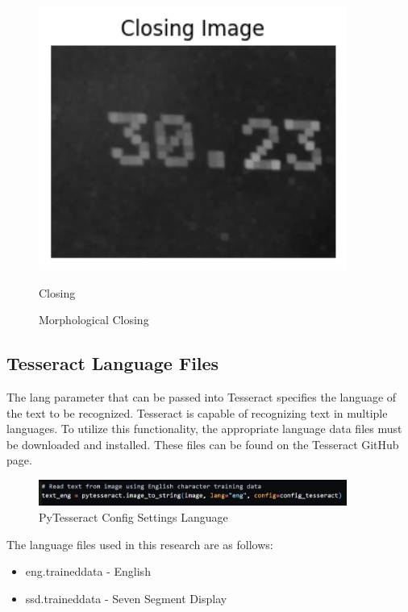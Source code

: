 \begin{figure}[h]
\begin{minipage}{0.30\textwidth}
        \includegraphics[width=0.9\textwidth]{Figures/closing/closing.png}
        \caption*{Closing}
    \end{minipage}
    \caption{Morphological Closing}
\end{figure}

\subsection{Tesseract Language Files}

The lang parameter that can be passed into Tesseract specifies the language of the text to be recognized. Tesseract is capable of recognizing text in multiple languages. To utilize this functionality, the appropriate language data files must be downloaded and installed. These files can be found on the Tesseract GitHub page. \cite{Tessdata2023}

\begin{figure}[ht]
    \centering
    \includegraphics[width=0.9\textwidth]{Figures/second_run/lang.jpg}
    \caption[PyTesseract Config Settings Language]{PyTesseract Config Settings Language}
    \label{fig:PyTesseract Config Settings - Language}
\end{figure}


The language files used in this research are as follows:

\begin{itemize}
    \item eng.traineddata - English
    \item ssd.traineddata - Seven Segment Display
\end{itemize}


